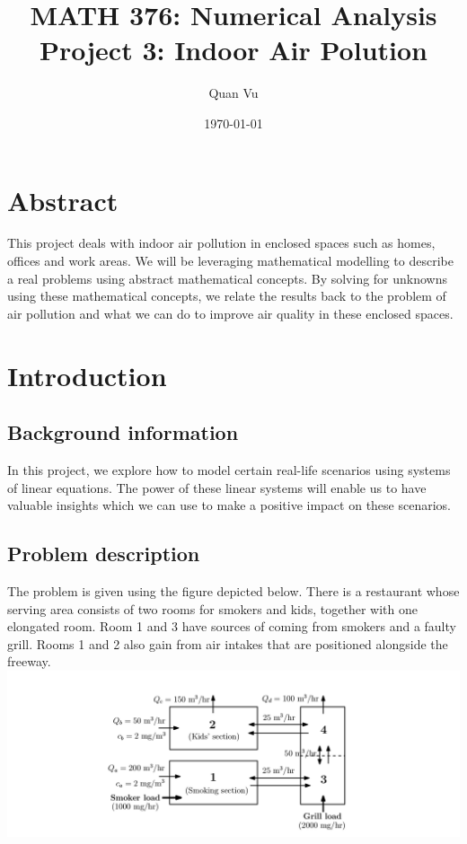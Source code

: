 \documentclass{article}
\title{%
	MATH 376: Numerical Analysis \\
	\large  Project 3: Indoor Air Polution
	}
\author{Quan Vu}
\date{\today}
\begin{document}
	\maketitle
	
	\section{Abstract}
	This project deals with indoor air pollution in enclosed spaces such as homes, offices and work areas. We will be leveraging mathematical modelling to describe a real problems using abstract mathematical concepts. By solving for unknowns using these mathematical concepts, we relate the results back to the problem of air pollution and what we can do to improve air quality in these enclosed spaces.
	
	\section{Introduction}
	
	\subsection{Background information}
	In this project, we explore how to model certain real-life scenarios using systems of linear equations. The power of these linear systems will enable us to have valuable insights which we can use to make a positive impact on these scenarios.
	
	\subsection{Problem description}
	The problem is given using the figure depicted below. There is a restaurant whose serving area consists of two rooms for smokers and kids, together with one elongated room. Room 1 and 3 have sources of  coming from smokers and a faulty grill. Rooms 1 and 2 also gain  from air intakes that are positioned alongside the freeway.\\
	\includegraphics[scale=0.22]{Problem.png}
    
\end{document}
